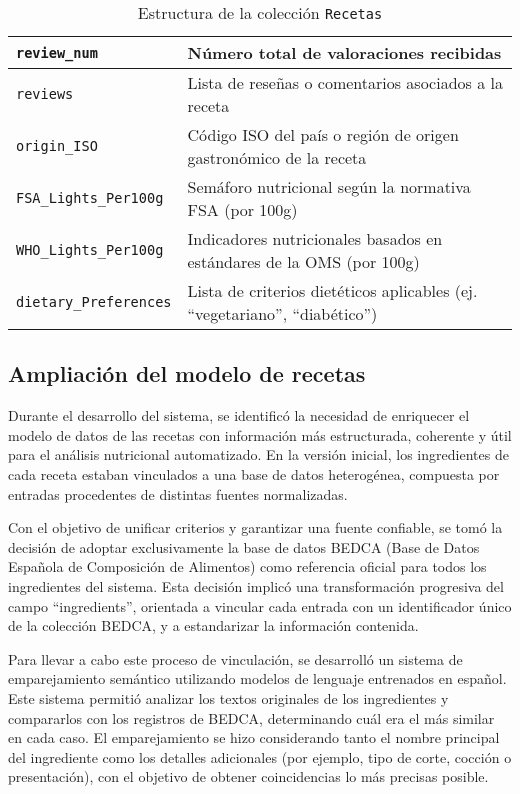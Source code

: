 \begin{table}
\begin{tabular}{|l|p{8cm}|}
        \texttt{review\_num} & Número total de valoraciones recibidas \\
        \hline
        \texttt{reviews} & Lista de reseñas o comentarios asociados a la receta \\
        \hline
        \texttt{origin\_ISO} & Código ISO del país o región de origen gastronómico de la receta \\
        \hline
        \texttt{FSA\_Lights\_Per100g} & Semáforo nutricional según la normativa FSA (por 100g) \\
        \hline
        \texttt{WHO\_Lights\_Per100g} & Indicadores nutricionales basados en estándares de la OMS (por 100g) \\
        \hline
        \texttt{dietary\_Preferences} & Lista de criterios dietéticos aplicables (ej. ``vegetariano'', ``diabético'') \\
        \hline
    \end{tabular}
    \caption{Estructura de la colección \texttt{Recetas}}
    \label{tab:recetas}
\end{table}

\subsection*{Ampliación del modelo de recetas}
Durante el desarrollo del sistema, se identificó la necesidad de enriquecer el modelo de datos de las recetas con información más estructurada, coherente y útil para el análisis nutricional automatizado. En la versión inicial, los ingredientes de cada receta estaban vinculados a una base de datos heterogénea, compuesta por entradas procedentes de distintas fuentes normalizadas. 

Con el objetivo de unificar criterios y garantizar una fuente confiable, se tomó la decisión de adoptar exclusivamente la base de datos BEDCA (Base de Datos Española de Composición de Alimentos) como referencia oficial para todos los ingredientes del sistema.
Esta decisión implicó una transformación progresiva del campo ``ingredients'', orientada a vincular cada entrada con un identificador único de la colección BEDCA, y a estandarizar la información contenida.

Para llevar a cabo este proceso de vinculación, se desarrolló un sistema de emparejamiento semántico utilizando modelos de lenguaje entrenados en español. Este sistema permitió analizar los textos originales de los ingredientes y compararlos con los registros de BEDCA, determinando cuál era el más similar en cada caso. El emparejamiento se hizo considerando tanto el nombre principal del ingrediente como los detalles adicionales (por ejemplo, tipo de corte, cocción o presentación), con el objetivo de obtener coincidencias lo más precisas posible.

